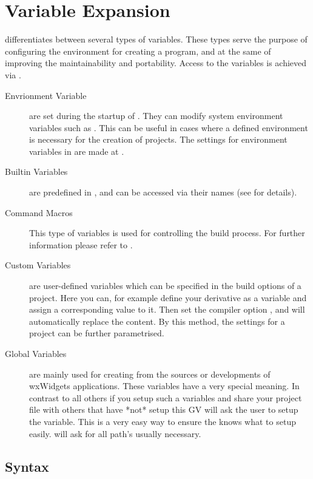 \chapter{Variable Expansion}\label{sec:variables_types}

\codeblocks differentiates between several types of variables. These types serve the purpose of configuring the environment for creating a program, and at the same of improving the maintainability and portability. Access to the \codeblocks variables is achieved via .


\begin{description}
\item[Envrionment Variable] are set during the startup of \codeblocks. They can modify system environment variables such as . This can be useful in cases where a defined environment is necessary for the creation of projects. The settings for environment variables in \codeblocks are made at .
\item[Builtin Variables] are predefined in \codeblocks, and can be accessed via their names  (see  for details).
\item[Command Macros] This type of variables is used for controlling the build process. For further information please refer to .
\item[Custom Variables] are user-defined variables which can be specified in the build options of a project. Here you can, for example define your derivative as a variable  and assign a corresponding value to it. Then set the compiler option , and \codeblocks will automatically replace the content. By this method, the settings for a project can be further parametrised.
\item[Global Variables] are mainly used for creating \codeblocks from the sources or developments of wxWidgets applications. These variables have a very special meaning. In contrast to all others if you setup such a variables and share your project file with others that have *not* setup this GV \codeblocks will ask the user to setup the variable. This is a very easy way to ensure the  knows what to setup easily. \codeblocks will ask for all path's usually necessary.
\end{description}

\section{Syntax}

